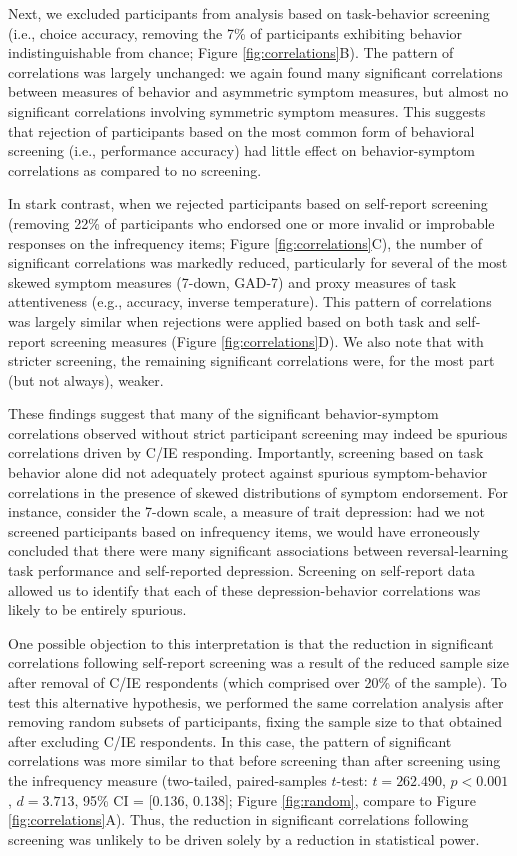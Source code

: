 \documentclass[a4paper,notitlepage,12pt]{article}
\begin{document}
\begin{refsection}[main]
Next, we excluded participants from analysis based on task-behavior screening (i.e., choice accuracy, removing the 7\% of participants exhibiting behavior indistinguishable from chance; Figure \ref{fig:correlations}B). The pattern of correlations was largely unchanged: we again found many significant correlations between measures of behavior and asymmetric symptom measures, but almost no significant correlations involving symmetric symptom measures. This suggests that rejection of participants based on the most common form of behavioral screening (i.e., performance accuracy) had little effect on behavior-symptom correlations as compared to no screening.  

In stark contrast, when we rejected participants based on self-report screening  (removing 22\% of participants who endorsed one or more invalid or improbable responses on the infrequency items; Figure \ref{fig:correlations}C), the number of significant correlations was markedly reduced, particularly for several of the most skewed symptom measures (7-down, GAD-7) and proxy measures of task attentiveness (e.g., accuracy, inverse temperature). This pattern of correlations was largely similar when rejections were applied based on both task and self-report screening measures (Figure \ref{fig:correlations}D). We also note that with stricter screening, the remaining significant correlations were, for the most part (but not always), weaker. 

These findings suggest that many of the significant behavior-symptom correlations observed without strict participant screening may indeed be spurious correlations driven by C/IE responding. Importantly, screening based on task behavior alone did not adequately protect against spurious symptom-behavior correlations in the presence of skewed distributions of symptom endorsement. For instance, consider the 7-down scale, a measure of trait depression: had we not screened participants based on infrequency items, we would have erroneously concluded that there were many significant associations between reversal-learning task performance and self-reported depression. Screening on self-report data allowed us to identify that each of these depression-behavior correlations was likely to be entirely spurious.

One possible objection to this interpretation is that the reduction in significant correlations following self-report screening was a result of the reduced sample size after removal of C/IE respondents (which comprised over 20\% of the sample). To test this alternative hypothesis, we performed the same correlation analysis after removing random subsets of participants, fixing the sample size to that obtained after excluding C/IE respondents. In this case, the pattern of significant correlations was more similar to that before screening than after screening using the infrequency measure (two-tailed, paired-samples $t$-test: $t = 262.490$, $p < 0.001$, $d = 3.713$, 95\% CI = [0.136, 0.138]; Figure \ref{fig:random}, compare to Figure \ref{fig:correlations}A). Thus, the reduction in significant correlations following screening was unlikely to be driven solely by a reduction in statistical power.


\end{refsection}
\end{document}
